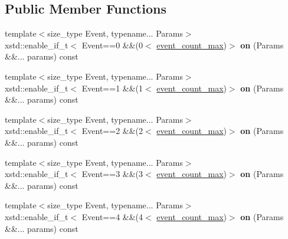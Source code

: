\subsection*{Public Member Functions}
\begin{DoxyCompactItemize}
\item 
\mbox{\label{classgko_1_1log_1_1Logger_aa57e96f583bb50087b76842bfb32c4c6}} 
{\footnotesize template$<$size\+\_\+type Event, typename... Params$>$ }\\xstd\+::enable\+\_\+if\+\_\+t$<$ Event==0 \&\&(0$<$ \hyperlink{classgko_1_1log_1_1Logger_a8794cd4bf2fd4d24ba9879bdca884dab}{event\+\_\+count\+\_\+max})$>$ {\bfseries on} (Params \&\&... params) const
\item 
\mbox{\label{classgko_1_1log_1_1Logger_a94084f28602e061ea6aa5ad5534d3c61}} 
{\footnotesize template$<$size\+\_\+type Event, typename... Params$>$ }\\xstd\+::enable\+\_\+if\+\_\+t$<$ Event==1 \&\&(1$<$ \hyperlink{classgko_1_1log_1_1Logger_a8794cd4bf2fd4d24ba9879bdca884dab}{event\+\_\+count\+\_\+max})$>$ {\bfseries on} (Params \&\&... params) const
\item 
\mbox{\label{classgko_1_1log_1_1Logger_a44174ab9ffc1b6c04ab3d2c679d3e697}} 
{\footnotesize template$<$size\+\_\+type Event, typename... Params$>$ }\\xstd\+::enable\+\_\+if\+\_\+t$<$ Event==2 \&\&(2$<$ \hyperlink{classgko_1_1log_1_1Logger_a8794cd4bf2fd4d24ba9879bdca884dab}{event\+\_\+count\+\_\+max})$>$ {\bfseries on} (Params \&\&... params) const
\item 
\mbox{\label{classgko_1_1log_1_1Logger_a0f351e506c0793f0651abbc625c47532}} 
{\footnotesize template$<$size\+\_\+type Event, typename... Params$>$ }\\xstd\+::enable\+\_\+if\+\_\+t$<$ Event==3 \&\&(3$<$ \hyperlink{classgko_1_1log_1_1Logger_a8794cd4bf2fd4d24ba9879bdca884dab}{event\+\_\+count\+\_\+max})$>$ {\bfseries on} (Params \&\&... params) const
\item 
\mbox{\label{classgko_1_1log_1_1Logger_a561ec596c1fe8665b9d8eaf4efbdbb5b}} 
{\footnotesize template$<$size\+\_\+type Event, typename... Params$>$ }\\xstd\+::enable\+\_\+if\+\_\+t$<$ Event==4 \&\&(4$<$ \hyperlink{classgko_1_1log_1_1Logger_a8794cd4bf2fd4d24ba9879bdca884dab}{event\+\_\+count\+\_\+max})$>$ {\bfseries on} (Params \&\&... params) const

\end{DoxyCompactItemize}
